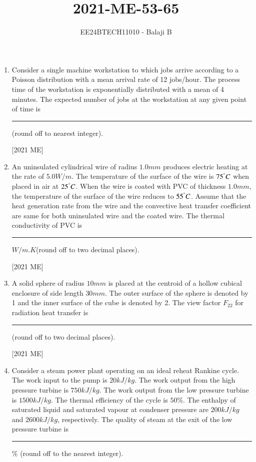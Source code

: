 \documentclass[journal]{IEEEtran}
\begin{document}

\vspace{3cm}

\title{2021-ME-53-65}
\author{EE24BTECH11010 - Balaji B}
{\let\newpage\relax\maketitle}
\begin{enumerate}
\item Consider a single machine workstation to which jobs arrive according to a
Poisson distribution with a mean arrival rate of 12 jobs/hour. The process
time of the workstation is exponentially distributed with a mean of 4
minutes. The expected number of jobs at the workstation at any given
point of time is \rule{2cm}{0.4pt} (round off to nearest integer).

\hfill [2021 ME]
    \item An uninsulated cylindrical wire of radius $1.0 mm$ produces electric heating
at the rate of $5.0 W/m$. The temperature of the surface of the wire is $75 ^\degree C$
when placed in air at $25 ^\degree C$. When the wire is coated with PVC of thickness
$1.0 mm$, the temperature of the surface of the wire reduces to $55 ^\degree C$.
Assume that the heat generation rate from the wire and the convective heat
transfer coefficient are same for both uninsulated wire and the coated wire.
The thermal conductivity of PVC is \rule{2cm}{0.4pt} $W/m.K$(round off to two decimal places). 

\hfill [2021 ME]
\item A solid sphere of radius $10 mm$ is placed at the centroid of a hollow cubical
enclosure of side length $30 mm$. The outer surface of the sphere is denoted
by 1 and the inner surface of the cube is denoted by 2. The view factor $F_{22}$
for radiation heat transfer is \rule{2cm}{0.4pt} (round off to two decimal places).

\hfill [2021 ME]
\item Consider a steam power plant operating on an ideal reheat Rankine cycle.
The work input to the pump is $20 kJ/kg$. The work output from the high
pressure turbine is $750 kJ/kg$. The work output from the low pressure
turbine is $1500 kJ/kg$. The thermal efficiency of the cycle is $50 \% $. The
enthalpy of saturated liquid and saturated vapour at condenser pressure
are $200 kJ/kg$ and $2600 kJ/kg$, respectively. The quality of steam at the exit
of the low pressure turbine is \rule{2cm}{0.4pt} $\%$ (round off to the nearest integer). 


\end{enumerate}
\end{document}
